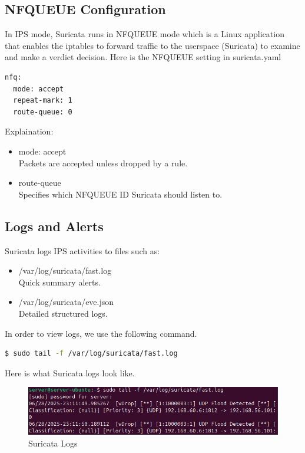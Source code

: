 \subsection{NFQUEUE Configuration}
In IPS mode, Suricata runs in NFQUEUE mode which is a Linux application that enables the iptables to forward traffic to the userspace (Suricata) to examine and make a verdict decision. Here is the NFQUEUE setting in suricata.yaml
\begin{lstlisting}[language=bash,caption={Part contains NFQUEUE}]
nfq:
  mode: accept
  repeat-mark: 1
  route-queue: 0
\end{lstlisting}
Explaination:
\begin{itemize}
    \item mode: accept \\
    Packets are accepted unless dropped by a rule.
    \item route-queue \\
    Specifies which NFQUEUE ID Suricata should listen to.
\end{itemize}
\subsection{Logs and Alerts}
Suricata logs IPS activities to files such as:
\begin{itemize}
    \item /var/log/suricata/fast.log\\
    Quick summary alerts.
    \item /var/log/suricata/eve.json\\
    Detailed structured logs.
\end{itemize}
In order to view logs, we use the following command.
\begin{lstlisting}[language=bash,caption={View Suricata logs}]
$ sudo tail -f /var/log/suricata/fast.log
\end{lstlisting}
Here is what Suricata logs look like.
\begin{figure}[!htb]
    \centering
    \includegraphics[width=0.8\linewidth]{thesis/suricataLog.png}
    \caption{Suricata Logs}
    \label{fig:enter-label}
\end{figure}
